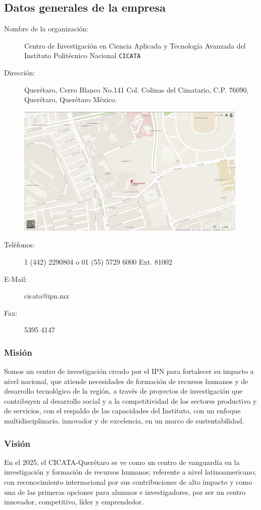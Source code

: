 \documentclass[12pt]{book} %
\begin{document}
	\subsection{Datos generales de la empresa}
	\begin{description}
		\item[Nombre de la organización:] Centro de Investigación en Ciencia Aplicada y Tecnología Avanzada del
			 Instituto Politécnico Nacional \texttt{CICATA}
			 
		\item[Dirección:] Querétaro, Cerro Blanco No.141 Col. Colinas del Cimatario, C.P. 76090, Querétaro, Querétaro
			 México.
			 \begin{center}
			 	\includegraphics[width=0.9\textwidth]{./imagenes/cicata}
			 \end{center}
		\item[Teléfonos:] 1 (442) 2290804 o 01 (55) 5729 6000 Ext. 81002
		\item[E-Mail:] cicata@ipn.mx 
		\item[Fax:] 5395 4147
	\end{description}
		\subsubsection{Misión}
			Somos un centro de investigación creado por el IPN para fortalecer su impacto a nivel nacional, que atiende
			necesidades de formación de recursos humanos y de desarrollo tecnológico de la región, a través de proyectos
			de investigación que contribuyen al desarrollo social y a la competitividad de los sectores productivo y de
			servicios, con el respaldo de las capacidades del Instituto, con un enfoque multidisciplinario, innovador y
			de excelencia, en un marco de sustentabilidad.
		
		\subsubsection{Visión}
			En el 2025, el CICATA-Querétaro se ve como un centro de vanguardia en la investigación y formación de 
			recursos humanos; referente a nivel latinoamericano; con reconocimiento internacional por sus contribuciones
			de alto impacto y como una de las primeras opciones para alumnos e investigadores, por ser un centro
			innovador, competitivo, líder y emprendedor.
		
\end{document}
